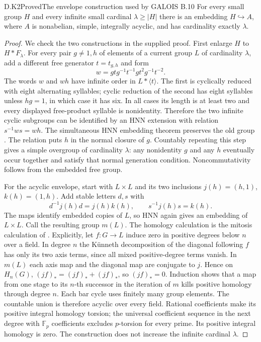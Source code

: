 \begin{result}{D.K2}{Proved}{The envelope construction used by GALOIS B.10}
For every small group $H$ and every infinite small cardinal
$\lambda\geq|H|$ there is an embedding $H\hookrightarrow A$,
where $A$ is nonabelian, simple, integrally acyclic, and has
cardinality exactly $\lambda$.
\end{result}
\begin{proof}
We check the two constructions in the supplied proof. First enlarge
$H$ to $H*F_\lambda$. For every pair $g\ne1,h$ of elements of a
current group $L$ of cardinality $\lambda$, add a different free
generator $t=t_{g,h}$ and form
\[
 w=gtg^{-1}t^{-1}gt^2g^{-1}t^{-2}.
\]
The words $w$ and $wh$ have infinite order in $L*\langle t\rangle$.
The first is cyclically reduced with eight alternating syllables;
cyclic reduction of the second has eight syllables unless $hg=1$,
in which case it has six. In all cases its length is at least two
and every displayed free-product syllable is nonidentity. Therefore
the two infinite cyclic subgroups can be identified by an HNN
extension with relation $s^{-1}ws=wh$. The simultaneous HNN
embedding theorem preserves the old group
\citep[Theorems~I--II]{AHigmanNeumannNeumann1949}. The relation puts
$h$ in the normal closure of $g$. Countably repeating this step
gives a simple overgroup of cardinality $\lambda$: any nonidentity
$g$ and any $h$ eventually occur together and satisfy that normal
generation condition. Noncommutativity follows from the embedded
free group.

For the acyclic envelope, start with $L\times L$ and its two
inclusions $j(h)=(h,1)$, $k(h)=(1,h)$. Add stable letters $d,s$
with
\[
 d^{-1}j(h)d=j(h)k(h),\qquad s^{-1}j(h)s=k(h).
\]
The maps identify embedded copies of $L$, so HNN again gives an
embedding of $L\times L$. Call the resulting group $m(L)$.
The homology calculation is the mitosis calculation of
\citet[Proposition~4.1 and Theorem~4.2]{ABaumslagDyerHeller1980}.
Explicitly, let $f:G\to L$ induce zero in positive degrees below
$n$ over a field. In degree $n$ the K\"unneth decomposition of the
diagonal following $f$ has only its two axis terms, since all
mixed positive-degree terms vanish. In $m(L)$ each axis map and
the diagonal map are conjugate to $j$. Hence on $H_n(G)$,
$(jf)_*=(jf)_*+(jf)_*$, so $(jf)_*=0$. Induction shows that a
map from one stage to its $n$-th successor in the iteration of
$m$ kills positive homology through degree $n$. Each bar cycle
uses finitely many group elements. The countable union is
therefore acyclic over every field. Rational coefficients make
its positive integral homology torsion; the universal coefficient
sequence in the next degree with $\mathbb F_p$ coefficients
excludes $p$-torsion for every prime. Its positive integral
homology is zero. The construction does not increase the
infinite cardinal $\lambda$.


\end{proof}

